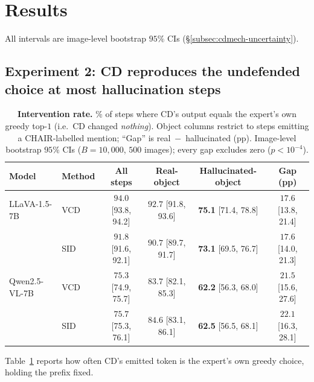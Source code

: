 
\section{Results}
\label{sec:cdmech-results}

All intervals are image-level bootstrap $95\%$ CIs (\S\ref{subsec:cdmech-uncertainty}).

\subsection{Experiment 2: CD reproduces the undefended choice at most
hallucination steps}
\label{subsec:cdmech-res-intervention}

\begin{table}[t]
\centering
\small
\setlength{\tabcolsep}{4pt}
\caption{\textbf{Intervention rate.} \% of steps where CD's output equals the
expert's own greedy top-$1$ (i.e.\ CD changed \emph{nothing}). Object columns
restrict to steps emitting a CHAIR-labelled mention; ``Gap'' is
real~$-$~hallucinated (pp). Image-level bootstrap $95\%$ CIs ($B=10{,}000$,
$500$ images); every gap excludes zero ($p<10^{-4}$).}
\label{tab:cdmech-intervention}
\begin{tabular}{llcccc}
\toprule
Model & Method & All steps & Real-object & Hallucinated-object & Gap (pp) \\
\midrule
LLaVA-1.5-7B
 & VCD & $94.0$ \tiny{[93.8, 94.2]} & $92.7$ \tiny{[91.8, 93.6]} & \textbf{75.1} \tiny{[71.4, 78.8]} & $17.6$ \tiny{[13.8, 21.4]} \\
 & SID & $91.8$ \tiny{[91.6, 92.1]} & $90.7$ \tiny{[89.7, 91.7]} & \textbf{73.1} \tiny{[69.5, 76.7]} & $17.6$ \tiny{[14.0, 21.3]} \\
\midrule
Qwen2.5-VL-7B
 & VCD & $75.3$ \tiny{[74.9, 75.7]} & $83.7$ \tiny{[82.1, 85.3]} & \textbf{62.2} \tiny{[56.3, 68.0]} & $21.5$ \tiny{[15.6, 27.6]} \\
 & SID & $75.7$ \tiny{[75.3, 76.1]} & $84.6$ \tiny{[83.1, 86.1]} & \textbf{62.5} \tiny{[56.5, 68.1]} & $22.1$ \tiny{[16.3, 28.1]} \\
\bottomrule
\end{tabular}
\end{table}

Table~\ref{tab:cdmech-intervention} reports how often CD's emitted token is
the expert's own greedy choice, holding the prefix fixed.

